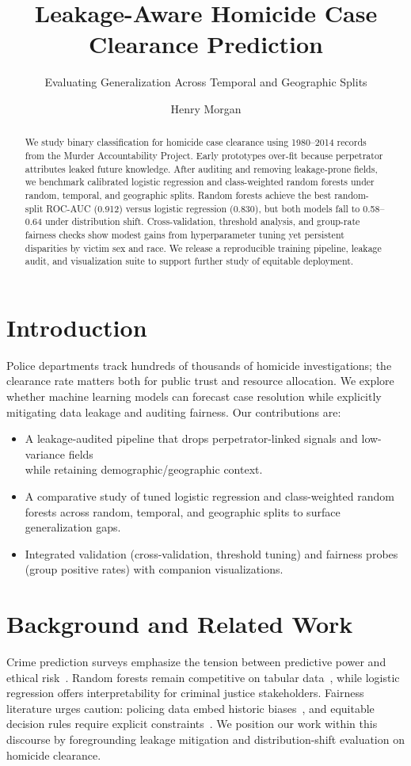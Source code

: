 \documentclass[sigconf]{acmart}
\title{Leakage-Aware Homicide Case Clearance Prediction}
\subtitle{Evaluating Generalization Across Temporal and Geographic Splits}
\author{Henry Morgan}
\affiliation{%
  \institution{University of Washington Bothell}
  \department{CSS 581: Machine Learning}
  \city{Bothell}
  \state{Washington}
  \country{USA}
}
\begin{document}
\begin{abstract}
We study binary classification for homicide case clearance using 1980--2014 records from the Murder Accountability Project. Early prototypes over-fit because perpetrator attributes leaked future knowledge. After auditing and removing leakage-prone fields, we benchmark calibrated logistic regression and class-weighted random forests under random, temporal, and geographic splits. Random forests achieve the best random-split ROC-AUC (0.912) versus logistic regression (0.830), but both models fall to 0.58--0.64 under distribution shift. Cross-validation, threshold analysis, and group-rate fairness checks show modest gains from hyperparameter tuning yet persistent disparities by victim sex and race. We release a reproducible training pipeline, leakage audit, and visualization suite to support further study of equitable deployment.
\end{abstract}

\maketitle

\section{Introduction}
Police departments track hundreds of thousands of homicide investigations; the clearance rate matters both for public trust and resource allocation. We explore whether machine learning models can forecast case resolution while explicitly mitigating data leakage and auditing fairness. Our contributions are:
\begin{itemize}
    \item A leakage-audited pipeline that drops perpetrator-linked signals and low-variance fields\\ while retaining demographic/geographic context.
    \item A comparative study of tuned logistic regression and class-weighted random forests across random, temporal, and geographic splits to surface generalization gaps.
    \item Integrated validation (cross-validation, threshold tuning) and fairness probes (group positive rates) with companion visualizations.
\end{itemize}

\section{Background and Related Work}
Crime prediction surveys emphasize the tension between predictive power and ethical risk~\cite{mandalapu2023crime}. Random forests remain competitive on tabular data~\cite{breiman2001random}, while logistic regression offers interpretability for criminal justice stakeholders. Fairness literature urges caution: policing data embed historic biases~\cite{lum2016predictive}, and equitable decision rules require explicit constraints~\cite{hardt2016equality,friedler2019comparative}. We position our work within this discourse by foregrounding leakage mitigation and distribution-shift evaluation on homicide clearance.
\end{document}
